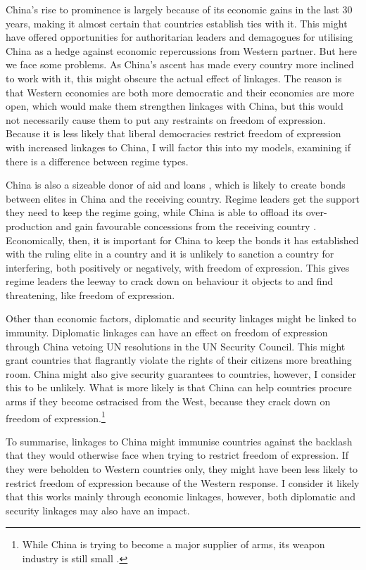 China's rise to prominence is largely because of its economic gains in the last 30 years, making it almost certain that countries establish ties with it. This might have offered opportunities for authoritarian leaders and demagogues for utilising China as a hedge against economic repercussions from Western partner. But here we face some problems. As China's ascent has made every country more inclined to work with it, this might obscure the actual effect of linkages. The reason is that Western economies are both more democratic and their economies are more open, which would make them strengthen linkages with China, but this would not necessarily cause them to put any restraints on freedom of expression. Because it is less likely that liberal democracies restrict freedom of expression with increased linkages to China, I will factor this into my models, examining if there is a difference between regime types.

China is also a sizeable donor of aid and loans \citep{fuchs_why_2022}, which is likely to create bonds between elites in China and the receiving country. Regime leaders get the support they need to keep the regime going, while China is able to offload its over-production and gain favourable concessions from the receiving country \citep{fuchs_why_2022}. Economically, then, it is important for China to keep the bonds it has established with the ruling elite in a country and it is unlikely to sanction a country for interfering, both positively or negatively, with freedom of expression. This gives regime leaders the leeway to crack down on behaviour it objects to and find threatening, like freedom of expression.

Other than economic factors, diplomatic and security linkages might be linked to immunity. Diplomatic linkages can have an effect on freedom of expression through China vetoing UN resolutions in the UN Security Council. This might grant countries that flagrantly violate the rights of their citizens more breathing room. China might also give security guarantees to countries, however, I consider this to be unlikely. What is more likely is that China can help countries procure arms if they become ostracised from the West, because they crack down on freedom of expression\citep{george_trends_2025, gunter_chinas_2024}.\footnote{While China is trying to become a major supplier of arms, its weapon industry is still small \citep{gunter_chinas_2024}.}

To summarise, linkages to China might immunise countries against the backlash that they would otherwise face when trying to restrict freedom of expression. If they were beholden to Western countries only, they might have been less likely to restrict freedom of expression because of the Western response. I consider it likely that this works mainly through economic linkages, however, both diplomatic and security linkages may also have an impact.

